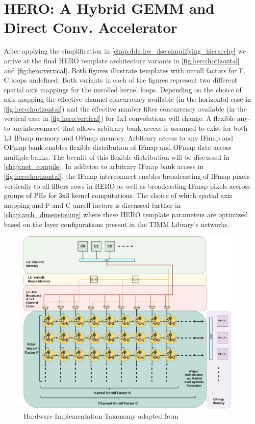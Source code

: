 \section{HERO: A Hybrid GEMM and Direct Conv. Accelerator}
\label{chap:dda:hw_dse:final}

After applying the simplification in
\autoref{chap:dda:hw_dse:simplifying_hierarchy} we arrive at the final HERO
template architecture variants in \autoref{fig:hero:horizontal} and
\autoref{fig:hero:vertical}. Both figures illustrate templates with unroll
factors for F, C loops undefined. Both variants in each of the figures represent
two different spatial axis mappings for the unrolled kernel loops. Depending on
the choice of axis mapping the effective channel concurrency available (in the
horizontal case in \autoref{fig:hero:horizontal}) and the effective number
filter concurrency available (in the vertical case in
\autoref{fig:hero:vertical}) for 1x1 convolutions will change. A flexible
any-to-anyinterconnect that allows arbitrary bank access is assumed to exist for
both L3 IFmap memory and OFmap memory. Arbitrary access to any IFmap and OFmap
bank enables flexible distribution of IFmap and OFmap data across multiple
banks. The beenfit of this flexible distribution will be discussed in
\autoref{chap:net_compile}. In addition to arbitrary IFmap bank access in
\autoref{fig:hero:horizontal}, the IFmap interconnect enables broadcasting of
IFmap pixels vertically to all filters rows in HERO as well as broadcasting
IFmap pixels accross groups of PEs for 3x3 kernel computations. The choice of
which spatial axis mapping and F and C unroll factors is discussed further in
\autoref{chap:arch_dimensioning} where these HERO template parameters are
optimized based on the layer configurations present in the TIMM Library's
networks.   

\begin{figure}[ht]
    \centering
    \includegraphics[scale=0.58]{fig/hero-t-horizontal.pdf}
    \caption{Hardware Implementation Taxonomy adapted from \cite{maestro}}
    \label{fig:hero:horizontal}
\end{figure}

